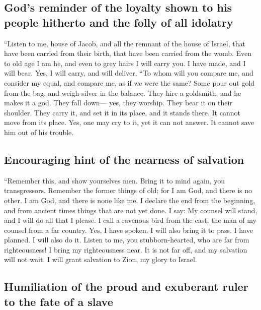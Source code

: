 \hypertarget{gods-reminder-of-the-loyalty-shown-to-his-people-hitherto-and-the-folly-of-all-idolatry}{%
\subsection{God's reminder of the loyalty shown to his people hitherto
and the folly of all
idolatry}\label{gods-reminder-of-the-loyalty-shown-to-his-people-hitherto-and-the-folly-of-all-idolatry}}

 ``Listen to me, house of Jacob, and all the remnant of
the house of Israel, that have been carried from their birth, that have
been carried from the womb.  Even to old age I am he, and
even to grey hairs I will carry you. I have made, and I will bear. Yes,
I will carry, and will deliver.  ``To whom will you
compare me, and consider my equal, and compare me, as if we were the
same?  Some pour out gold from the bag, and weigh silver
in the balance. They hire a goldsmith, and he makes it a god. They fall
down--- yes, they worship.  They bear it on their
shoulder. They carry it, and set it in its place, and it stands there.
It cannot move from its place. Yes, one may cry to it, yet it can not
answer. It cannot save him out of his trouble.

\hypertarget{encouraging-hint-of-the-nearness-of-salvation}{%
\subsection{Encouraging hint of the nearness of
salvation}\label{encouraging-hint-of-the-nearness-of-salvation}}

 ``Remember this, and show yourselves men. Bring it to
mind again, you transgressors.  Remember the former things
of old; for I am God, and there is no other. I am God, and there is none
like me.  I declare the end from the beginning, and from
ancient times things that are not yet done. I say: My counsel will
stand, and I will do all that I please.  I call a
ravenous bird from the east, the man of my counsel from a far country.
Yes, I have spoken. I will also bring it to pass. I have planned. I will
also do it.  Listen to me, you stubborn-hearted, who are
far from righteousness!  I bring my righteousness near.
It is not far off, and my salvation will not wait. I will grant
salvation to Zion, my glory to Israel.

\hypertarget{humiliation-of-the-proud-and-exuberant-ruler-to-the-fate-of-a-slave}{%
\subsection{Humiliation of the proud and exuberant ruler to the fate of
a
slave}\label{humiliation-of-the-proud-and-exuberant-ruler-to-the-fate-of-a-slave}}

